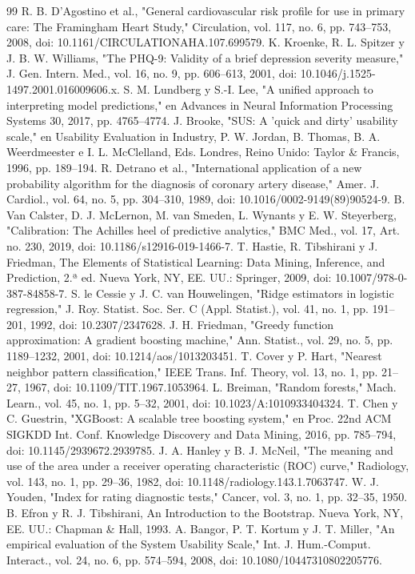 \documentclass[conference]{IEEEtran}
\begin{document}
\begin{thebibliography}{99}
 R. B. D'Agostino et al., "General cardiovascular risk profile for use in primary care: The Framingham Heart Study," Circulation, vol. 117, no. 6, pp. 743--753, 2008, doi: 10.1161/CIRCULATIONAHA.107.699579.
 K. Kroenke, R. L. Spitzer y J. B. W. Williams, "The PHQ-9: Validity of a brief depression severity measure," J. Gen. Intern. Med., vol. 16, no. 9, pp. 606--613, 2001, doi: 10.1046/j.1525-1497.2001.016009606.x.
 S. M. Lundberg y S.-I. Lee, "A unified approach to interpreting model predictions," en Advances in Neural Information Processing Systems 30, 2017, pp. 4765--4774.
 J. Brooke, "SUS: A 'quick and dirty' usability scale," en Usability Evaluation in Industry, P. W. Jordan, B. Thomas, B. A. Weerdmeester e I. L. McClelland, Eds. Londres, Reino Unido: Taylor \& Francis, 1996, pp. 189--194.
 R. Detrano et al., "International application of a new probability algorithm for the diagnosis of coronary artery disease," Amer. J. Cardiol., vol. 64, no. 5, pp. 304--310, 1989, doi: 10.1016/0002-9149(89)90524-9.
 B. Van Calster, D. J. McLernon, M. van Smeden, L. Wynants y E. W. Steyerberg, "Calibration: The Achilles heel of predictive analytics," BMC Med., vol. 17, Art. no. 230, 2019, doi: 10.1186/s12916-019-1466-7.
 T. Hastie, R. Tibshirani y J. Friedman, The Elements of Statistical Learning: Data Mining, Inference, and Prediction, 2.ª ed. Nueva York, NY, EE. UU.: Springer, 2009, doi: 10.1007/978-0-387-84858-7.
 S. le Cessie y J. C. van Houwelingen, "Ridge estimators in logistic regression," J. Roy. Statist. Soc. Ser. C (Appl. Statist.), vol. 41, no. 1, pp. 191--201, 1992, doi: 10.2307/2347628.
 J. H. Friedman, "Greedy function approximation: A gradient boosting machine," Ann. Statist., vol. 29, no. 5, pp. 1189--1232, 2001, doi: 10.1214/aos/1013203451.
 T. Cover y P. Hart, "Nearest neighbor pattern classification," IEEE Trans. Inf. Theory, vol. 13, no. 1, pp. 21--27, 1967, doi: 10.1109/TIT.1967.1053964.
 L. Breiman, "Random forests," Mach. Learn., vol. 45, no. 1, pp. 5--32, 2001, doi: 10.1023/A:1010933404324.
 T. Chen y C. Guestrin, "XGBoost: A scalable tree boosting system," en Proc. 22nd ACM SIGKDD Int. Conf. Knowledge Discovery and Data Mining, 2016, pp. 785--794, doi: 10.1145/2939672.2939785.
 J. A. Hanley y B. J. McNeil, "The meaning and use of the area under a receiver operating characteristic (ROC) curve," Radiology, vol. 143, no. 1, pp. 29--36, 1982, doi: 10.1148/radiology.143.1.7063747.
 W. J. Youden, "Index for rating diagnostic tests," Cancer, vol. 3, no. 1, pp. 32--35, 1950.
 B. Efron y R. J. Tibshirani, An Introduction to the Bootstrap. Nueva York, NY, EE. UU.: Chapman \& Hall, 1993.
 A. Bangor, P. T. Kortum y J. T. Miller, "An empirical evaluation of the System Usability Scale," Int. J. Hum.-Comput. Interact., vol. 24, no. 6, pp. 574--594, 2008, doi: 10.1080/10447310802205776.
\end{thebibliography}
\end{document}
